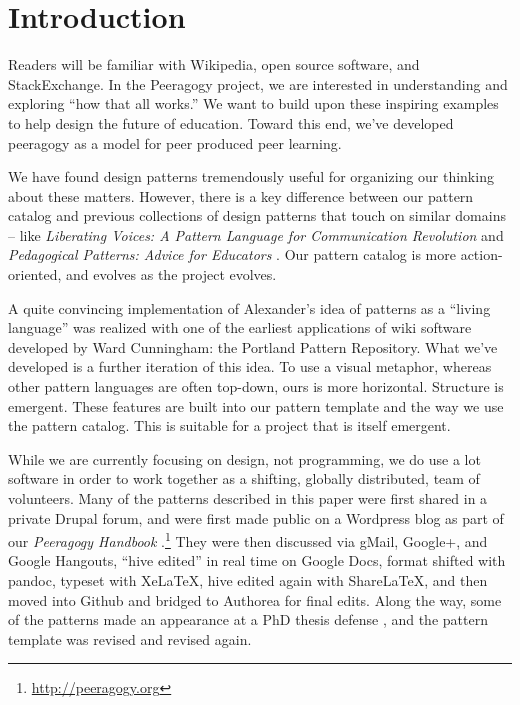 \section{Introduction}\label{sec:Introduction}

Readers will be familiar with Wikipedia, open source software, and StackExchange.  In the Peeragogy project, we are interested in understanding and exploring ``how that all works.''    We want to build upon these inspiring examples to help design the future of education.  Toward this end, we've developed peeragogy as a model for peer produced peer learning.

We have found design patterns tremendously useful for organizing our thinking about these matters.  However, there is a key difference between our pattern catalog and previous collections of design patterns that touch on similar domains -- like \emph{Liberating Voices: A Pattern Language for Communication Revolution} \cite{schuler2008liberating} and \emph{Pedagogical Patterns: Advice for Educators} \cite{bergin2012pedagogical}.  Our pattern catalog is more action-oriented, and evolves as the project evolves.   

A quite convincing implementation of Alexander’s idea of patterns as a ``living language'' \cite[p.~xvii]{alexander1977pattern} was realized with one of the earliest applications of wiki software developed by Ward Cunningham: the Portland Pattern Repository. What we've developed is a further iteration of this idea. To use a visual metaphor, whereas other pattern languages are often top-down, ours is more horizontal.  Structure is emergent.  These features are built into our pattern template and the way we use the pattern catalog.  This is suitable for a project that is itself emergent.

While we are currently focusing on design, not programming, we do use a lot software in order to work together as a shifting, globally distributed, team of volunteers.  Many of the patterns described in this paper were first shared in a private Drupal forum, and were first made public on a Wordpress blog as part of our \emph{Peeragogy Handbook} \cite{peeragogy-handbook}.\footnote{\url{http://peeragogy.org}}  They were then discussed via gMail, Google+, and Google Hangouts, ``hive edited'' in real time on Google Docs, format shifted with pandoc, typeset with XeLaTeX, hive edited again with ShareLaTeX, and then moved into Github and bridged to Authorea for final edits.  Along the way, some of the patterns made an appearance at a PhD thesis defense \cite{corneli-thesis}, and the pattern template was revised and revised again.  

